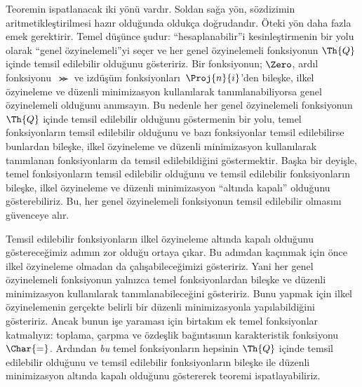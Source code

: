 \documentclass[../../../include/open-logic-section]{subfiles}
\begin{document}
Teoremin ispatlanacak iki yönü vardır. Soldan sağa yön, sözdizimin
aritmetikleştirilmesi hazır olduğunda oldukça doğrudandır. Öteki yön daha
fazla emek gerektirir. Temel düşünce şudur: ``hesaplanabilir''i kesinleştirmenin
bir yolu olarak ``genel özyinelemeli''yi seçer ve her genel özyinelemeli
fonksiyonun $\Th{Q}$ içinde temsil edilebilir olduğunu gösteririz. Bir
fonksiyonun; $\Zero$, ardıl fonksiyonu~$\Succ$ ve izdüşüm
fonksiyonları~$\Proj{n}{i}$'den bileşke, ilkel özyineleme ve düzenli
minimizasyon kullanılarak tanımlanabiliyorsa genel özyinelemeli olduğunu
anımsayın. Bu nedenle her genel özyinelemeli fonksiyonun $\Th{Q}$ içinde
temsil edilebilir olduğunu göstermenin bir yolu, temel fonksiyonların temsil
edilebilir olduğunu ve bazı fonksiyonlar temsil edilebilirse bunlardan
bileşke, ilkel özyineleme ve düzenli minimizasyon kullanılarak tanımlanan
fonksiyonların da temsil edilebildiğini göstermektir. Başka bir deyişle,
temel fonksiyonların temsil edilebilir olduğunu ve temsil edilebilir
fonksiyonların bileşke, ilkel özyineleme ve düzenli minimizasyon ``altında
kapalı'' olduğunu gösterebiliriz. Bu, her genel özyinelemeli fonksiyonun
temsil edilebilir olmasını güvenceye alır.

Temsil edilebilir fonksiyonların ilkel özyineleme altında kapalı olduğunu
göstereceğimiz adımın zor olduğu ortaya çıkar. Bu adımdan kaçınmak için önce
ilkel özyineleme olmadan da çalışabileceğimizi gösteririz. Yani her genel
özyinelemeli fonksiyonun yalnızca temel fonksiyonlardan bileşke ve düzenli
minimizasyon kullanılarak tanımlanabileceğini gösteririz. Bunu yapmak için
ilkel özyinelemenin gerçekte belirli bir düzenli minimizasyonla yapılabildiğini
gösteririz. Ancak bunun işe yaraması için birtakım ek temel fonksiyonlar
katmalıyız: toplama, çarpma ve özdeşlik bağıntısının karakteristik
fonksiyonu~$\Char{=}$. Ardından \emph{bu} temel fonksiyonların hepsinin
$\Th{Q}$ içinde temsil edilebilir olduğunu ve temsil edilebilir fonksiyonların
bileşke ile düzenli minimizasyon altında kapalı olduğunu göstererek teoremi
ispatlayabiliriz.
\end{document}
